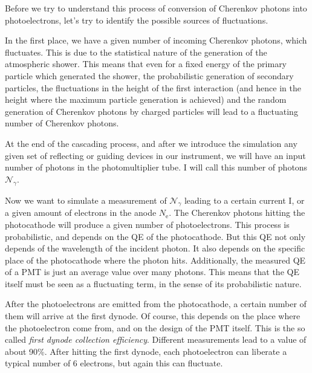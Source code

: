 \documentclass{article}
\def\Cherenkov{Cherenkov\xspace}
\def\QE{\ensuremath{\mathcal{QE}}\xspace}
\def\Nphot{\ensuremath{%
  \mathcal{N}_{\gamma}}\xspace}
\begin{document}
Before we try to understand this process of conversion of \Cherenkov
photons into photoelectrons, let's try to identify the possible
sources of fluctuations.

In the first place, we have a given number of incoming \Cherenkov
photons, which fluctuates. This is due to the statistical nature of
the generation of the atmospheric shower. This means that even for a
fixed energy of the primary particle which generated the shower, the
probabilistic generation of secondary particles, the fluctuations in
the height of the first interaction (and hence in the height where the
maximum particle generation is achieved) and the random generation of
\Cherenkov photons by charged particles will lead to a fluctuating
number of Cherenkov photons.

At the end of the cascading process, and after we introduce the
simulation any given set of reflecting or guiding devices in our
instrument, we will have an input number of photons in the
photomultiplier tube. I will call this number of photons \Nphot.

Now we want to simulate a measurement of \Nphot leading to a certain
current I, or a given amount of electrons in the anode
$N_{\mathrm{e}}$. The \Cherenkov photons hitting the photocathode will
produce a given number of photoelectrons. This process is
probabilistic, and depends on the QE of the photocathode. But this QE
not only depends of the wavelength of the incident photon. It also
depends on the specific place of the photocathode where the photon
hits. Additionally, the measured QE of a PMT is just an average value
over many photons. This means that the QE itself must be seen as a
fluctuating term, in the sense of its probabilistic nature.


After the photoelectrons are emitted from the photocathode, a certain
number of them will arrive at the first dynode. Of course, this
depends on the place where the photoelectron come from, and on the
design of the PMT itself. This is the so called \emph{first dynode
collection efficiency}. Different measurements lead to a value of
about 90\%. After hitting the first dynode, each photoelectron can
liberate a typical number of 6 electrons, but again this can
fluctuate. 
\end{document}
